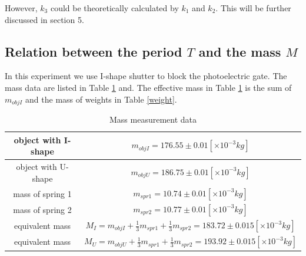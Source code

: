     However, $k_3$ could be theoretically calculated by $k_1$ and $k_2$. This will be further discussed in section 5.\\

\subsection{Relation between the period $T$ and the mass $M$}
    In this experiment we use I-shape shutter to block the photoelectric gate. The mass data are listed in Table \ref{M} and. The effective mass in Table \ref{M} is the sum of $m_{objI}$ and the mass of weights in Table \ref{weight}.

    \begin{table}[h]
        \centering
        \begin{tabular}{|c|c|}
            \hline
            object with I-shape & $m_{objI}=176.55\pm 0.01[\times10^{-3}kg]$\\ \hline
            object with U-shape & $m_{objU}=186.75\pm 0.01[\times10^{-3}kg]$\\ \hline
            mass of spring 1 & $m_{spr1}=10.74\pm 0.01[\times10^{-3}kg]$\\ \hline
            mass of spring 2 & $m_{spr2}=10.77\pm 0.01[\times10^{-3}kg]$\\ \hline
            equivalent mass & $M_I=m_{objI}+\frac{1}{3}m_{spr1}+\frac{1}{3}m_{spr2}=183.72\pm 0.015[\times10^{-3}kg]$\\ \hline
            equivalent mass & $M_U=m_{objU}+\frac{1}{3}m_{spr1}+\frac{1}{3}m_{spr2}=193.92\pm 0.015[\times10^{-3}kg]$\\ \hline
        \end{tabular}
        \caption{Mass measurement data}\label{M}
    \end{table}
    \vspace{1cm}
